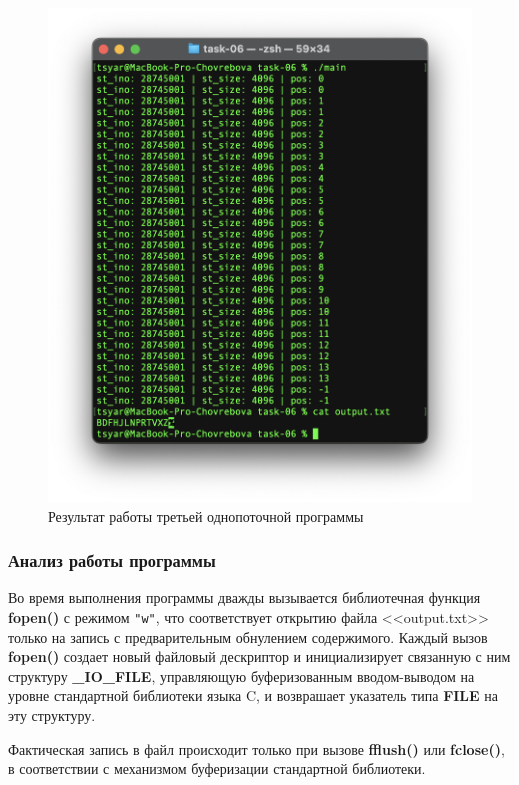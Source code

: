 \begin{figure}[h!] 
	\centering
	\includegraphics[width=1.0\textwidth]{./img/third-01.png}
	\caption{Результат работы третьей однопоточной программы}
	\label{fig:1111}
\end{figure}

\subsubsection*{Анализ работы программы}

Во время выполнения программы дважды вызывается библиотечная функция \textbf{fopen()} с режимом \texttt{"w"}, что соответствует открытию файла <<output.txt>> только на запись с предварительным обнулением содержимого. Каждый вызов \textbf{fopen()} создает новый файловый дескриптор и инициализирует связанную с ним структуру \textbf{\_IO\_FILE}, управляющую буферизованным вводом-выводом на уровне стандартной библиотеки языка C, и возврашает указатель типа \textbf{FILE} на эту структуру.

Фактическая запись в файл происходит только при вызове \textbf{fflush()} или \textbf{fclose()}, в соответствии с механизмом буферизации стандартной библиотеки.

